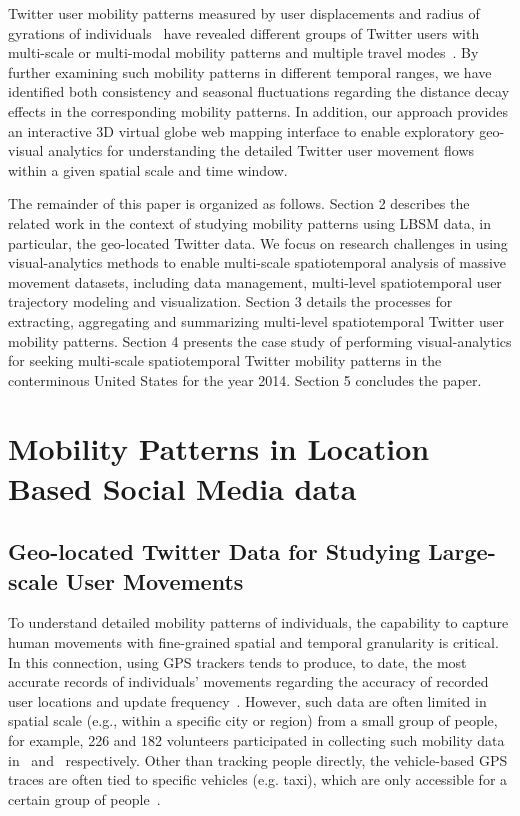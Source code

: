 \documentclass[ijgi,article,accept,moreauthors,pdftex,10pt,a4paper]{mdpi}
\theoremstyle{mdpi}
\newcounter{ex}
\newcounter{re}
\theoremstyle{mdpidefinition}
\begin{document}
Twitter user mobility patterns measured by user displacements and radius of gyrations of individuals~\cite{gonzalez2008understanding} have revealed different groups of Twitter users with multi-scale or multi-modal mobility patterns and multiple travel modes~\cite{Jurdak2015}.
By further examining such mobility patterns in different temporal ranges, we have identified both consistency and seasonal fluctuations regarding the distance decay effects in the corresponding mobility patterns.
In addition, our approach provides an interactive 3D virtual globe web mapping interface to enable exploratory geo-visual analytics for understanding the detailed Twitter user movement flows within a given spatial scale and time window.

The remainder of this paper is organized as follows.
Section 2 describes the related work in the context of studying mobility patterns using LBSM data, in particular, the geo-located Twitter data.
We focus on research challenges in using visual-analytics methods to enable multi-scale spatiotemporal analysis of massive movement datasets, including data management, multi-level spatiotemporal user trajectory modeling and visualization.
Section 3 details the processes for extracting, aggregating and summarizing multi-level spatiotemporal Twitter user mobility patterns.
Section 4 presents the case study of performing visual-analytics for seeking multi-scale spatiotemporal Twitter mobility patterns in the conterminous United States for the year 2014.
Section 5 concludes the paper.

\section{Mobility Patterns in Location Based Social Media data}
\subsection{Geo-located Twitter Data for Studying Large-scale User Movements}
To understand detailed mobility patterns of individuals, the capability to capture human movements with fine-grained spatial and temporal granularity is critical.
In this connection, using GPS trackers tends to produce, to date, the most accurate records of individuals' movements regarding the accuracy of recorded user locations and update frequency~\cite{zheng2008understanding}.
However, such data are often limited in spatial scale (e.g., within a specific city or region) from a small group of people, for example, 226 and 182 volunteers participated in collecting such mobility data in~\cite{rhee2011levy} and~\cite{zheng2010geolife} respectively.
Other than tracking people directly, the vehicle-based GPS traces are often tied to specific vehicles (e.g. taxi), which are only accessible for a certain group of people~\cite{kung2014exploring}. 
\end{document}
